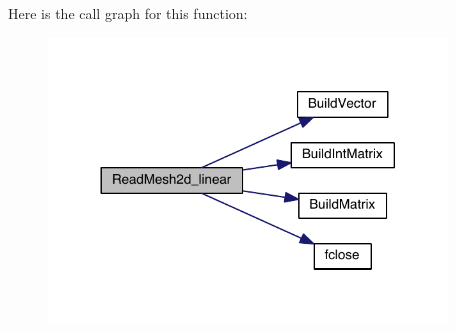 Here is the call graph for this function\+:\nopagebreak
\begin{figure}[H]
\begin{center}
\leavevmode
\includegraphics[width=300pt]{a00581_a992690ab68b8564681b5a038ca111413_cgraph}
\end{center}
\end{figure}
